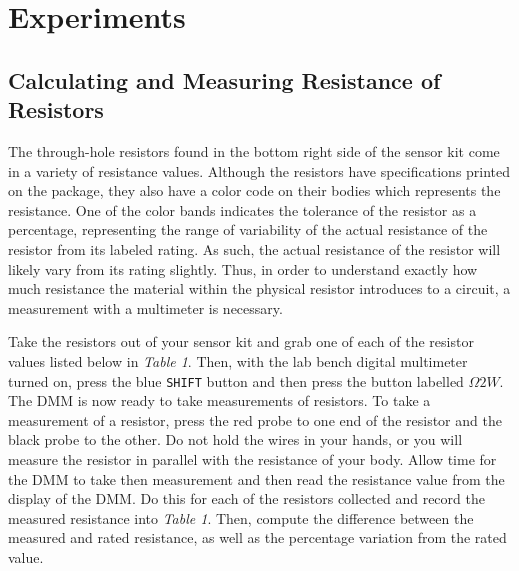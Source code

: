 \documentclass[12pt]{article}
\begin{document}
\section{Experiments}
\subsection{Calculating and Measuring Resistance of Resistors}

The through-hole resistors found in the bottom right side of the sensor kit come in a variety of resistance values. Although the resistors have specifications printed on the package, they also have a color code on their bodies which represents the resistance. One of the color bands indicates the tolerance of the resistor as a percentage, representing the range of variability of the actual resistance of the resistor from its labeled rating. As such, the actual resistance of the resistor will likely vary from its rating slightly. Thus, in order to understand exactly how much resistance the material within the physical resistor introduces to a circuit, a measurement with a multimeter is necessary.

Take the resistors out of your sensor kit and grab one of each of the resistor values listed below in \textit{Table 1}. Then, with the lab bench digital multimeter turned on, press the blue \texttt{SHIFT} button and then  press the button labelled $\Omega 2W$. The DMM is now ready to take measurements of resistors. To take a measurement of a resistor, press the red probe to one end of the resistor and the black probe to the other.  Do not hold the wires in your hands, or you will measure the resistor in parallel with the resistance of your body.  Allow time for the DMM to take then measurement and then read the resistance value from the display of the DMM. Do this for each of the resistors collected and record the measured resistance into \textit{Table 1}. Then, compute the difference between the measured and rated resistance, as well as the percentage variation from the rated value.
\end{document}
